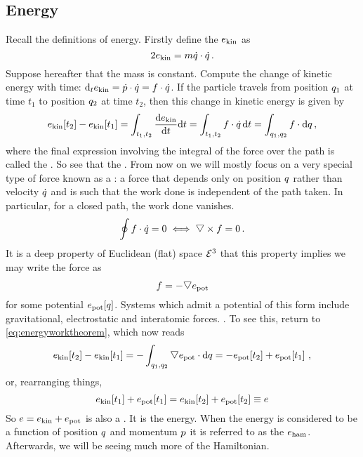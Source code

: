\subsection{Energy}
%
Recall the definitions of energy. Firstly define the  $e_\text{kin}$ as
%
\begin{equation}
  2e_\text{kin} = m\dot{q}\cdot\dot{q}\,.
\end{equation}
%
Suppose hereafter that the mass is constant. Compute the change of kinetic energy with time: $\text{d}_{t}e_\text{kin} = \dot{p}\cdot\dot{q} = f\cdot\dot{q}$. If the particle travels from position $q_1$ at time $t_1$ to position $q_2$ at time $t_2$, then this change in kinetic energy is given by
%
\begin{equation}\label{eq:energyworktheorem}
  e_\text{kin}\!\left[{t_2}\right] - e_\text{kin}\!\left[{t_1}\right] = \int_{t_1,t_2}{\dfrac{\text{d}{e_\text{kin}}}{\text{d}{t}}}\text{d} t
                                  = \int_{t_1,t_2}{f\cdot\dot{q}}\,{\text{d} t}
                                  = \int_{q_1,q_2}{f\cdot\text{d}q}\,,
\end{equation}
%
where the final expression involving the integral of the force over the path is called the . So see that the . From now on we will mostly focus on a very special type of force known as a : a force that depends only on position $q$ rather than velocity $\dot{q}$ and is such that the work done is independent of the path taken. In particular, for a closed path, the work done vanishes.
%
\begin{equation}
  \oint\force\iprod\dt\pos = 0 \iff \gder\cprod\force = 0\,.
\end{equation}
%
It is a deep property of Euclidean (flat) space $\mathcal{E}^{3}$ that this property implies we may write the force as
%
\begin{equation}
  \force = -\gder\epot
\end{equation}
%
for some potential $e_\text{pot}\!\left[{q}\right]$. Systems which admit a potential of this form include gravitational, electrostatic and interatomic forces. . To see this, return to \cref{eq:energyworktheorem}, which now reads
%
\begin{equation}
  \ekin\vat{t_2} - \ekin\vat{t_1} = -\sint{\pos_1,\pos_2}{\gder\epot\iprod\dx\pos}
                                  = -\epot\vat{t_2} + \epot\vat{t_1}\,,
\end{equation}
%
or, rearranging things,
%
\begin{equation}
  e_\text{kin}\!\left[{t_1}\right] + e_\text{pot}\!\left[{t_1}\right] = e_\text{kin}\!\left[{t_2}\right] + e_\text{pot}\!\left[{t_2}\right]
                                  \equiv e
\end{equation}
%
So $e = e_\text{kin} + e_\text{pot}$ is also a . It is the energy. When the energy is considered to be a function of position $q$ and momentum $p$ it is referred to as the  $e_\text{ham}$. Afterwards, we will be seeing much more of the Hamiltonian.


